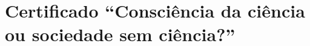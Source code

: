 \postextual

\anexos
\chapter{Certificado “Consciência da ciência ou sociedade sem ciência?”}\label{ch:certificado-consciencia-da-ciencia-ou-sociedade-sem-ciencia}


